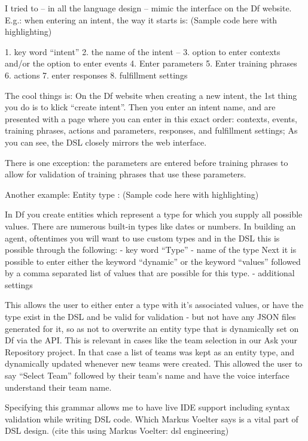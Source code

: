 I tried to – in all the language design – mimic the interface on the Df website.
E.g.: when entering an intent, the way it starts is: (Sample code here with highlighting)

1. key word “intent”
2. the name of the intent –
3. option to enter contexts and/or the option to enter events
4. Enter parameters
5. Enter training phrases
6. actions
7. enter responses
8. fulfillment settings


The cool things is:
On the Df website when creating a new intent, the 1st thing you do is to klick “create intent”.
Then you enter an intent name, and are presented with a page where you can enter in this exact order: contexts, events, training phrases, actions and parameters, responses, and fulfillment settings;
As you can see, the DSL closely mirrors the web interface.

There is one exception: the parameters are entered before training phrases to allow for validation of training phrases that use these parameters.


Another example: Entity type : (Sample code here with highlighting)

In Df you create entities which represent a type for which you supply all possible values.
There are numerous built-in types like dates or numbers.
In building an agent, oftentimes you will want to use custom types and in the DSL this is possible through the following:
- key word “Type”
- name of the type
Next it is possible to enter either the keyword “dynamic” or the keyword “values” followed by a comma separated list of values that are possible for this type.
- additional settings

This allows the user to either enter a type with it’s associated values, or have the type exist in the DSL and be valid for validation - but not have any JSON files generated for it, so as not to overwrite an entity type that is dynamically set on Df via the API.
This is relevant in cases like the team selection in our Ask your Repository project.
In that case a list of teams was kept as an entity type, and dynamically updated whenever new teams were created. This allowed the user to say “Select Team” followed by their team’s name and have the voice interface understand their team name.


Specifying this grammar allows me to have live IDE support including syntax validation while writing DSL code. Which Markus Voelter says is a vital part of DSL design. (cite this using Markus Voelter: dsl engineering)

